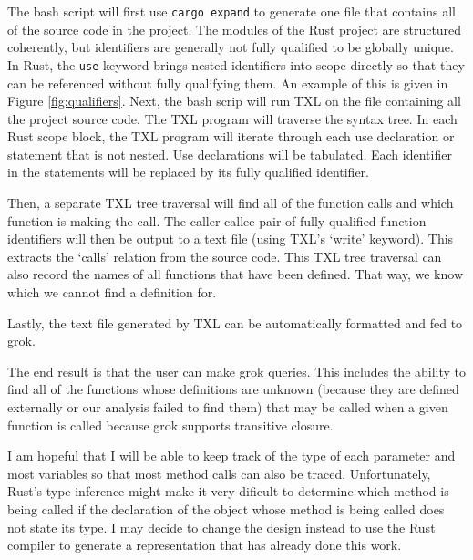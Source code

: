 \documentclass[11pt]{article}
\begin{document}
The bash script will first use \lstinline{cargo expand} to generate one file that contains all of the source code in the project.
The modules of the Rust project are structured coherently, but identifiers are generally not fully qualified to be globally unique.
In Rust, the \lstinline{use} keyword brings nested identifiers into scope directly so that they can be referenced without fully qualifying them.
An example of this is given in Figure \ref{fig:qualifiers}.
Next, the bash scrip will run TXL on the file containing all the project source code.
The TXL program will traverse the syntax tree.
In each Rust scope block, the TXL program will iterate through each use declaration or statement that is not nested.
Use declarations will be tabulated.
Each identifier in the statements will be replaced by its fully qualified identifier.

Then, a separate TXL tree traversal will find all of the function calls and which function is making the call.
The caller callee pair of fully qualified function identifiers will then be output to a text file (using TXL's `write' keyword).
This extracts the `calls' relation from the source code.
This TXL tree traversal can also record the names of all functions that have been defined.
That way, we know which we cannot find a definition for.

Lastly, the text file generated by TXL can be automatically formatted and fed to grok.

The end result is that the user can make grok queries.
This includes the ability to find all of the functions whose definitions are unknown (because they are defined externally or our analysis failed to find them) that may be called when a given function is called because grok supports transitive closure.

I am hopeful that I will be able to keep track of the type of each parameter and most variables so that most method calls can also be traced.
Unfortunately, Rust's type inference might make it very dificult to determine which method is being called if the declaration of the object whose method is being called does not state its type.
I may decide to change the design instead to use the Rust compiler to generate a representation that has already done this work.

\end{document}
